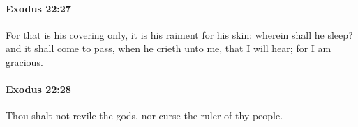 		\paragraph{Exodus 22:27} %
			\label{EXODUS-22-27}

			For that is his covering only, it is his raiment for his skin: wherein shall he sleep? and it shall come to pass, when he crieth unto me, that I will hear; for I am gracious.


		\paragraph{Exodus 22:28} %
			\label{EXODUS-22-28}

			Thou shalt not revile the gods, nor curse the ruler of thy people.


